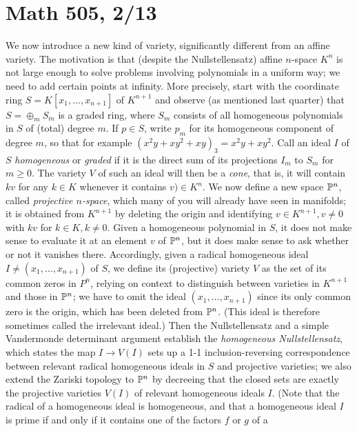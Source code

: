 \documentclass[10pt]{article}
\begin{document}
\section*{Math 505, 2/13}

We now introduce a new kind of variety, significantly different from an
affine variety. The motivation is that (despite the Nullstellensatz)
affine $n$-space $K^n$ is not large enough to solve problems involving
polynomials in a uniform way; we need to add certain points at infinity.
More precisely, start with the coordinate ring $S =
K[x_1,\ldots,x_{n+1}]$ of $K^{n+1}$ and observe (as mentioned last
quarter) that $S = \oplus_m S_m$ is a graded ring, where $S_m$ consists
of all homogeneous polynomials in $S$ of (total) degree $m$. If $p\in
S$, write $p_m$ for its homogeneous component of degree $m$, so that for
example $(x^2 y + x y^2 + xy)_3 = x^2 y + x y^2$. Call an ideal $I$ of
$S$ {\sl homogeneous} or {\sl graded} if it is the direct sum of its
projections $I_m$ to $S_m$ for $m\ge0$. The variety $V$ of such an ideal
will then be a {\sl cone}, that is, it will contain $kv$ for any $k\in
K$ whenever it contains $v)\in K^n$. We now define a new space $\Bbb
P^n$, called {\sl projective $n$-space}, which many of you will already
have seen in manifolds; it is obtained from $K^{n+1}$ by deleting the
origin and identifying $v\in K^{n+1},v\ne0$ with $kv$ for $k\in
K,k\ne0$. Given a homogeneous polynomial in $S$, it does not make sense
to evaluate it at an element $v$ of $\Bbb P^n$, but it does make sense
to ask whether or not it vanishes there. Accordingly, given a radical
homogeneous ideal $I\ne(x_1,\ldots,x_{n+1})$ of $S$, we define its
(projective) variety $V$ as the set of its common zeros in $P^n$,
relying on context to distinguish between varieties in $K^{n+1}$ and
those in $\Bbb P^n$; we have to omit the ideal $(x_1,\ldots,x_{n+1})$
since its only common zero is the origin, which has been deleted from
$\Bbb P^n$. (This ideal is therefore sometimes called the irrelevant
ideal.) Then the Nullstellensatz and a simple Vandermonde determinant
argument establish the {\sl homogeneous Nullstellensatz}, which states
the map $I\rightarrow V(I)$ sets up a 1-1 inclusion-reversing
correspondence between relevant radical homogeneous ideals in $S$ and
projective varieties; we also extend the Zariski topology to $\Bbb P^n$
by decreeing that the closed sets are exactly the projective varieties
$V(I)$ of relevant homogeneous ideals $I$. (Note that the radical of a
homogeneous ideal is homogeneous, and that a homogeneous ideal $I$ is
prime if and only if it contains one of the factors $f$ or $g$ of a
\end{document}
